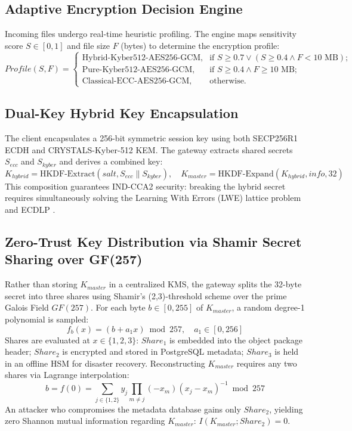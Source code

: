 \documentclass{llncs}
\begin{document}
\subsection{Adaptive Encryption Decision Engine}
Incoming files undergo real-time heuristic profiling. The engine maps sensitivity score $S \in [0, 1]$ and file size $F$ (bytes) to determine the encryption profile:
\begin{equation}
Profile(S, F) = 
\begin{cases}
\text{Hybrid-Kyber512-AES256-GCM}, & \text{if } S \geq 0.7 \lor (S \geq 0.4 \land F < 10\text{ MB}); \\
\text{Pure-Kyber512-AES256-GCM}, & \text{if } S \geq 0.4 \land F \geq 10\text{ MB}; \\
\text{Classical-ECC-AES256-GCM}, & \text{otherwise.}
\end{cases}
\end{equation}

\subsection{Dual-Key Hybrid Key Encapsulation}
The client encapsulates a 256-bit symmetric session key using both SECP256R1 ECDH and CRYSTALS-Kyber-512 KEM. The gateway extracts shared secrets $S_{ecc}$ and $S_{kyber}$ and derives a combined key:
\begin{equation}
K_{hybrid} = \text{HKDF-Extract}(salt, S_{ecc} \parallel S_{kyber}), \quad K_{master} = \text{HKDF-Expand}(K_{hybrid}, info, 32)
\end{equation}
This composition guarantees IND-CCA2 security: breaking the hybrid secret requires simultaneously solving the Learning With Errors (LWE) lattice problem and ECDLP \cite{bindel2019hybrid}.

\subsection{Zero-Trust Key Distribution via Shamir Secret Sharing over GF(257)}
Rather than storing $K_{master}$ in a centralized KMS, the gateway splits the 32-byte secret into three shares using Shamir's (2,3)-threshold scheme over the prime Galois Field $GF(257)$. For each byte $b \in [0, 255]$ of $K_{master}$, a random degree-1 polynomial is sampled:
\begin{equation}
f_b(x) = (b + a_1 x) \bmod 257, \quad a_1 \in [0, 256]
\end{equation}
Shares are evaluated at $x \in \{1, 2, 3\}$: $Share_1$ is embedded into the object package header; $Share_2$ is encrypted and stored in PostgreSQL metadata; $Share_3$ is held in an offline HSM for disaster recovery. Reconstructing $K_{master}$ requires any two shares via Lagrange interpolation:
\begin{equation}
b = f(0) = \sum_{j \in \{1,2\}} y_j \prod_{m \neq j} (-x_m)(x_j - x_m)^{-1} \bmod 257
\end{equation}
An attacker who compromises the metadata database gains only $Share_2$, yielding zero Shannon mutual information regarding $K_{master}$: $I(K_{master}; Share_2) = 0$.
\end{document}
